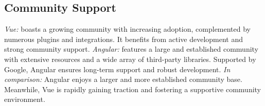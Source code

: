 \documentclass[conference]{IEEEtran}
\begin{document}

\subsection{Community Support}

\textit{Vue:} boasts a growing community with increasing adoption, complemented by numerous plugins and integrations. It benefits from active development and strong community support.
\newline\textit{Angular:} features a large and established community with extensive resources and a wide array of third-party libraries. Supported by Google, Angular ensures long-term support and robust development.
\newline\textit{In comparison:} Angular enjoys a larger and more established community base. Meanwhile, Vue is rapidly gaining traction and fostering a supportive community environment.



\end{document}
